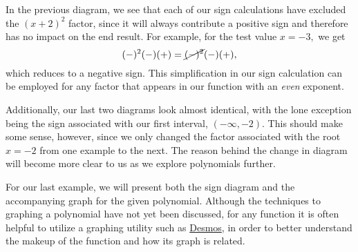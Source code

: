 \documentclass[12pt]{book}
\theoremstyle{definition}
\newcommand{\Desmos}{\href{https://www.desmos.com/}{Desmos}}
\begin{document}
In the previous diagram, we see that each of our sign calculations have excluded the $(x+2)^2$ factor, since it will always contribute a positive sign and therefore has no impact on the end result.  For example, for the test value $x=-3,$ we get
$$(-)^2(-)(+)=\cancel{(-)^2}(-)(+),$$
which reduces to a negative sign.  This simplification in our sign calculation can be employed for any factor that appears in our function with an {\it even} exponent.
\par
Additionally, our last two diagrams look almost identical, with the lone exception being the sign associated with our first interval, $(-\infty,-2)$.  This should make some sense, however, since we only changed the factor associated with the root $x=-2$ from one example to the next.  The reason behind the change in diagram will become more clear to us as we explore polynomials further.
\par
For our last example, we will present both the sign diagram and the accompanying graph for the given polynomial.  Although the techniques to graphing a polynomial have not yet been discussed, for any function it is often helpful to utilize a graphing utility such as \Desmos, in order to better understand the makeup of the function and how its graph is related.
\end{document}
